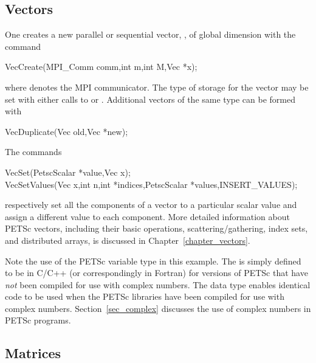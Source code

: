 \subsection*{Vectors}
\label{sec_vecintro}

One creates a new parallel or 
sequential vector, , of global dimension  with the 
command  
\begin{tabbing}
  VecCreate(MPI\_Comm comm,int m,int M,Vec *x);
\end{tabbing}
where  denotes the MPI communicator. The type of storage
for the vector may be set with either calls to 
 or .  
Additional vectors of the same type can be formed with
\begin{tabbing}
  VecDuplicate(Vec old,Vec *new);
\end{tabbing}
The commands  
\begin{tabbing}
  VecSet(PetscScalar *value,Vec x);\\
  VecSetValues(Vec x,int n,int *indices,PetscScalar *values,INSERT\_VALUES);
\end{tabbing}
respectively set all the components of a vector to a particular scalar
value and assign a different value to each component.  More
detailed information about PETSc vectors, including their basic
operations, scattering/gathering, index sets, and distributed arrays, is
discussed in Chapter~\ref{chapter_vectors}.

 
Note the use of the PETSc variable type  in this example.
The  is simply defined to be  in C/C++
(or correspondingly   in Fortran) for versions of
PETSc that have {\em not} been compiled for use with complex numbers.
The  data type enables
identical code to be used when the PETSc libraries have been compiled
for use with complex numbers.  Section~\ref{sec_complex} discusses the
use of complex numbers in PETSc programs.

\subsection*{Matrices}
\label{sec_matintro}

